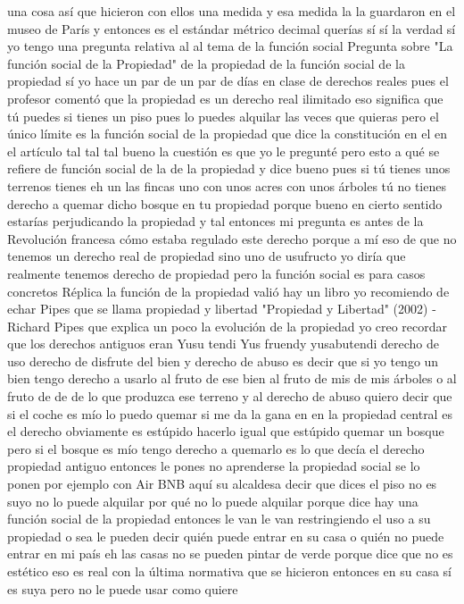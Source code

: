 una cosa así que hicieron con ellos una medida y esa medida la la guardaron en el museo de París y entonces es el estándar métrico decimal
querías sí sí la verdad sí yo tengo una pregunta relativa al al tema de la función social
Pregunta sobre "La función social de la Propiedad"
de la propiedad de la función social de la propiedad sí yo hace un par de un par de días en clase de derechos reales
pues el profesor comentó que la propiedad es un derecho real ilimitado eso significa que tú puedes
si tienes un piso pues lo puedes alquilar las veces que quieras pero el único límite
es la función social de la propiedad que dice la constitución en el en el artículo tal tal tal bueno la cuestión es que yo le pregunté
pero esto a qué se refiere de función social de la de la propiedad y dice bueno pues si tú tienes unos terrenos tienes
eh un las fincas uno con unos acres con unos árboles tú no tienes derecho a quemar
dicho bosque en tu propiedad porque bueno en cierto sentido estarías perjudicando la propiedad y tal
entonces mi pregunta es antes de la Revolución francesa cómo estaba regulado este derecho
porque a mí eso de que no tenemos un derecho real de propiedad sino uno de usufructo
yo diría que realmente tenemos derecho de propiedad pero la función social es para casos concretos
Réplica
la función de la propiedad valió hay un libro yo recomiendo de echar Pipes que se llama propiedad y libertad
"Propiedad y Libertad" (2002) - Richard Pipes
que explica un poco la evolución de la propiedad yo creo recordar que los derechos antiguos eran Yusu tendi Yus fruendy yusabutendi
derecho de uso derecho de disfrute del bien y derecho de abuso es decir que si yo tengo un bien
tengo derecho a usarlo al fruto de ese bien al fruto de mis de mis árboles o al fruto de de de lo que produzca ese terreno
y al derecho de abuso quiero decir que si el coche es mío lo puedo quemar si me da la gana
en en la propiedad central es el derecho obviamente es estúpido hacerlo igual que estúpido quemar un bosque
pero si el bosque es mío tengo derecho a quemarlo es lo que decía el derecho propiedad antiguo entonces le pones no aprenderse la propiedad social
se lo ponen por ejemplo con Air BNB aquí su alcaldesa decir que dices el piso no es suyo no lo puede alquilar
por qué no lo puede alquilar porque dice hay una función social de la propiedad entonces le van le van restringiendo el uso a su propiedad
o sea le pueden decir quién puede entrar en su casa o quién no puede entrar en mi país eh las casas no se pueden pintar de verde
porque dice que no es estético eso es real con la última normativa que se hicieron entonces en su casa sí es suya pero no le puede usar como quiere
